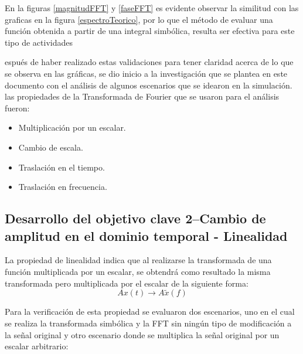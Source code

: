 \documentclass[11pt,letterpaper,twocolumn]{article}
\begin{document}
        En la figuras \ref{magnitudFFT} y \ref{faseFFT} es evidente observar la similitud con las graficas en
        la figura \ref{espectroTeorico}, por lo que el método de evaluar una función obtenida a partir de una 
        integral simbólica, resulta ser efectiva para este tipo de actividades 
        
        espués de haber realizado estas validaciones para tener claridad acerca de lo que se 
        observa en las gráficas, se dio inicio a la investigación que se plantea en este documento
        con el análisis de algunos escenarios que se idearon en la simulación. las propiedades de 
        la Transformada de Fourier que se usaron para el análisis fueron:
        
        \begin{itemize}
            \item Multiplicación por un escalar.
            \item Cambio de escala.
            \item Traslación en el tiempo.
            \item Traslación en frecuencia.
        \end{itemize}
        
    \subsection{Desarrollo del objetivo clave 2--Cambio de amplitud en el dominio temporal - Linealidad}
        La propiedad de linealidad indica que al realizarse la transformada de una función multiplicada por un escalar, se obtendrá como resultado la misma transformada pero multiplicada por el escalar de la siguiente forma: 
        \begin{equation}
            A{x}(t) \rightarrow A\tilde{x}(f)
            \label{Linearidad}
        \end{equation}
        
        Para la verificación de esta propiedad se evaluaron dos escenarios, uno en el cual se realiza la transformada simbólica y la FFT sin ningún tipo de modificación a la señal original y otro escenario donde se multiplica la señal original por un escalar arbitrario:
        
\end{document}
